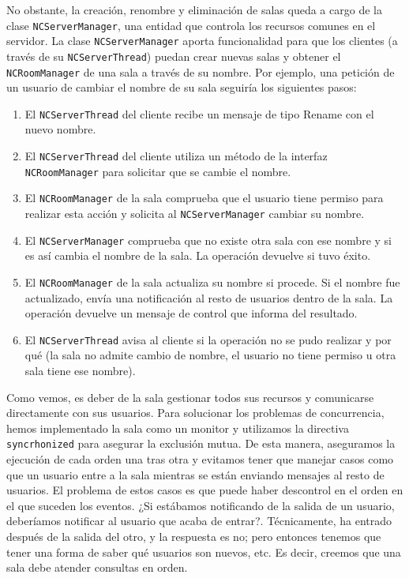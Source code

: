 

No obstante, la creación, renombre y eliminación de salas queda a cargo de la clase \lstinline!NCServerManager!, una entidad que controla los recursos comunes en el servidor. La clase \lstinline!NCServerManager! aporta funcionalidad para que los clientes (a través de su \lstinline!NCServerThread!) puedan crear nuevas salas y obtener el \lstinline!NCRoomManager! de una sala a través de su nombre. Por ejemplo, una petición de un usuario de cambiar el nombre de su sala seguiría los siguientes pasos:

\begin{enumerate}
    \item El \lstinline!NCServerThread! del cliente recibe un mensaje de tipo Rename con el nuevo nombre.
    \item El \lstinline!NCServerThread! del cliente utiliza un método de la interfaz \lstinline!NCRoomManager! para solicitar que se cambie el nombre.
    \item El \lstinline!NCRoomManager! de la sala comprueba que el usuario tiene permiso para realizar esta acción y solicita al \lstinline!NCServerManager! cambiar su nombre.
    \item El \lstinline!NCServerManager! comprueba que no existe otra sala con ese nombre y si es así cambia el nombre de la sala. La operación devuelve si tuvo éxito.
    \item El \lstinline!NCRoomManager! de la sala actualiza su nombre si procede. Si el nombre fue actualizado, envía una notificación al resto de usuarios dentro de la sala. La operación devuelve un mensaje de control que informa del resultado.
    \item El \lstinline!NCServerThread! avisa al cliente si la operación no se pudo realizar y por qué (la sala no admite cambio de nombre, el usuario no tiene permiso u otra sala tiene ese nombre).
\end{enumerate}

Como vemos, es deber de la sala gestionar todos sus recursos y comunicarse directamente con sus usuarios. Para solucionar los problemas de concurrencia, hemos implementado la sala como un monitor y utilizamos la directiva \lstinline!syncrhonized! para asegurar la exclusión mutua. De esta manera, aseguramos la ejecución de cada orden una tras otra y evitamos tener que manejar casos como que un usuario entre a la sala mientras se están enviando mensajes al resto de usuarios. El problema de estos casos es que puede haber descontrol en el orden en el que suceden los eventos. ¿Si estábamos notificando de la salida de un usuario, deberíamos notificar al usuario que acaba de entrar?. Técnicamente, ha entrado después de la salida del otro, y la respuesta es no; pero entonces tenemos que tener una forma de saber qué usuarios son nuevos, etc. Es decir, creemos que una sala debe atender consultas en orden.

